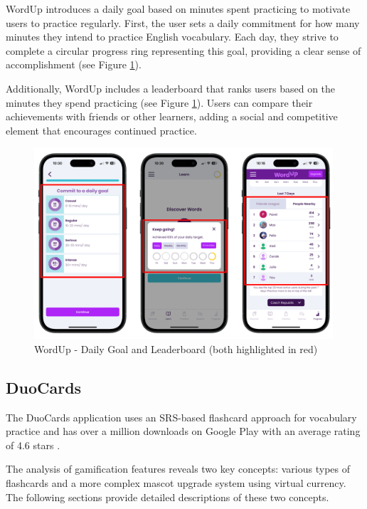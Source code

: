 \begin{itemize}
    WordUp introduces a daily goal based on minutes spent practicing to motivate users to practice regularly. First, the user sets a daily commitment for how many minutes they intend to practice English vocabulary. Each day, they strive to complete a circular progress ring representing this goal, providing a clear sense of accomplishment (see Figure \ref{fig:wordup-daily-goal}).
    
    Additionally, WordUp includes a leaderboard that ranks users based on the minutes they spend practicing (see Figure \ref{fig:wordup-daily-goal}). Users can compare their achievements with friends or other learners, adding a social and competitive element that encourages continued practice. 

    \begin{figure}[!h]
        \includegraphics[width=0.99\textwidth]{chapters/images/wordup-daily-goal.png}
        \caption{WordUp - Daily Goal and Leaderboard (both highlighted in red)}
        \label{fig:wordup-daily-goal}
    \end{figure}

\end{itemize}

\subsection{DuoCards}

The DuoCards application uses an SRS-based flashcard approach for vocabulary practice and has over a million downloads on Google Play with an average rating of 4.6 stars \cite{cite:duocards_google_play}. 

The analysis of gamification features reveals two key concepts: various types of flashcards and a more complex mascot upgrade system using virtual currency. The following sections provide detailed descriptions of these two concepts.

